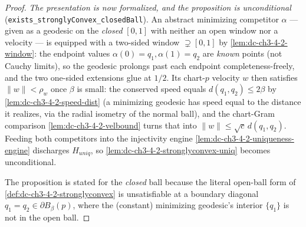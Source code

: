 \begin{proof}
  \emph{The presentation is now formalized, and the proposition is unconditional}
  (\texttt{exists\_stronglyConvex\_closedBall}). An abstract minimizing competitor $\alpha$ --- given
  as a geodesic on the \emph{closed} $[0,1]$ with neither an open window nor a velocity --- is
  equipped with a two-sided window $\supsetneq[0,1]$ by \cref{lem:dc-ch3-4-2-window}: the endpoint
  values $\alpha(0)=q_1,\alpha(1)=q_2$ are \emph{known} points (not Cauchy limits), so the geodesic
  prolongs past each endpoint completeness-freely, and the two one-sided extensions glue at $1/2$. Its
  chart-$p$ velocity $w$ then satisfies $\|w\|<\rho_w$ once $\beta$ is small: the conserved speed
  equals $d(q_1,q_2)\le2\beta$ by \cref{lem:dc-ch3-4-2-speed-dist} (a minimizing geodesic has speed
  equal to the distance it realizes, via the radial isometry of the normal ball), and the chart-Gram
  comparison \cref{lem:dc-ch3-4-2-velbound} turns that into $\|w\|\le\sqrt{c}\,d(q_1,q_2)$. Feeding
  both competitors into the injectivity engine \cref{lem:dc-ch3-4-2-uniqueness-engine} discharges
  $H_{uniq}$, so \cref{lem:dc-ch3-4-2-stronglyconvex-uniq} becomes unconditional.

  The proposition is stated for the \emph{closed} ball because the literal open-ball
  form of \cref{def:dc-ch3-4-2-stronglyconvex} is unsatisfiable at a boundary diagonal
  $q_1=q_2\in\partial B_\beta(p)$, where the (constant) minimizing geodesic's interior $\{q_1\}$ is
  not in the open ball.
\end{proof}
